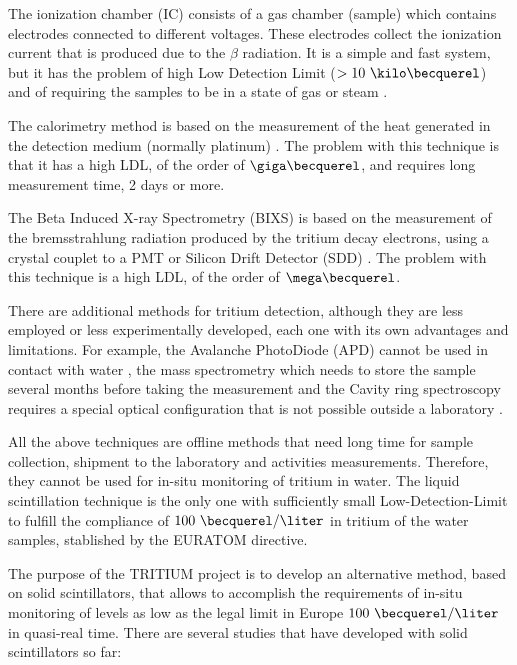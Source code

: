 The ionization chamber (IC) consists of a gas chamber (sample) which contains electrodes connected to different voltages. These electrodes collect the ionization current that is produced due to the $\beta$ radiation. It is a simple and fast system, but it has the problem of high Low Detection Limit ($> 10~\kilo\becquerel$) and of requiring the samples to be in a state of gas or steam \cite{IonizationChamber1, IonizationChamber2}.

The calorimetry method is based on the measurement of the heat generated in the detection medium (normally platinum) \cite{Calorimeter1, Calorimeter2}. The problem with this technique is that it has a high LDL, of the order of $\giga\becquerel$, and requires long measurement time, 2 days or more.

The Beta Induced X-ray Spectrometry (BIXS) is based on the measurement of the bremsstrahlung radiation produced by the tritium decay electrons, using a  crystal couplet to a PMT  \cite{XRays1, XRays2} or Silicon Drift Detector (SDD) \cite{Bremstrahlung}. The problem with this technique is a high LDL, of the order of $\mega\becquerel$.

There are additional methods for tritium detection, although they are less employed or less experimentally developed, each one with its own advantages and limitations. For example, the Avalanche PhotoDiode (APD) cannot be used in contact with water \cite{APD},  the mass spectrometry which needs to store the sample several months before taking the measurement \cite{Spectrometry} and the Cavity ring spectroscopy requires a special optical configuration that is not possible outside a laboratory \cite{Ring}.

All the above techniques are offline methods that need long time for sample collection, shipment to the laboratory and activities measurements. Therefore, they cannot be used for in-situ monitoring of tritium in water. The liquid scintillation technique is the only one with sufficiently small Low-Detection-Limit to fulfill the compliance of $100~\becquerel/\liter$ in tritium of the water samples, stablished by the EURATOM directive. 

The purpose of the TRITIUM project is to develop an alternative method, based on solid scintillators, that allows to accomplish the requirements of in-situ monitoring of levels as low as the legal limit in Europe $100~\becquerel/\liter$ in quasi-real time. There are several studies that have developed with solid scintillators so far:

